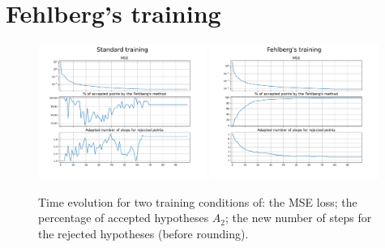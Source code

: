 \documentclass{article}
\begin{document}
\section{Fehlberg's training }
\label{sec:fehlberg-training}

\begin{figure}[thb]
  \centering
  \includegraphics[width=0.49\textwidth]{./figs/batch_training}
  \includegraphics[width=0.49\textwidth]{./figs/fehlberg_training}
  \caption{Time evolution for two training conditions of: the MSE loss; the percentage of
    accepted hypotheses $A_2$; the new number of steps for the rejected
    hypotheses (before rounding).}
  \label{fig:training_series}
\end{figure}
\end{document}
